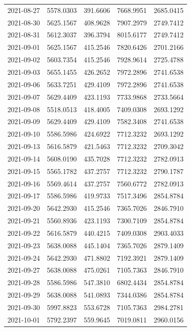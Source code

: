 \begin{footnotesize}
\begin{longtable}{lllll}
2021-08-27 & 5578.0303 & 391.6606 & 7668.9951 & 2685.0415 \\
2021-08-30 & 5625.1567 & 408.9628 & 7907.2979 & 2749.7412 \\
2021-08-31 & 5612.3037 & 396.3794 & 8015.6177 & 2749.7412 \\
2021-09-01 & 5625.1567 & 415.2546 & 7820.6426 & 2701.2166 \\
2021-09-02 & 5603.7354 & 415.2546 & 7928.9614 & 2725.4788 \\
2021-09-03 & 5655.1455 & 426.2652 & 7972.2896 & 2741.6538 \\
2021-09-06 & 5633.7251 & 429.4109 & 7972.2896 & 2741.6538 \\
2021-09-07 & 5629.4409 & 423.1193 & 7733.9868 & 2733.5664 \\
2021-09-08 & 5518.0513 & 418.4005 & 7409.0308 & 2693.1292 \\
2021-09-09 & 5629.4409 & 429.4109 & 7582.3408 & 2741.6538 \\
2021-09-10 & 5586.5986 & 424.6922 & 7712.3232 & 2693.1292 \\
2021-09-13 & 5616.5879 & 421.5463 & 7712.3232 & 2709.3042 \\
2021-09-14 & 5608.0190 & 435.7028 & 7712.3232 & 2782.0913 \\
2021-09-15 & 5565.1782 & 437.2757 & 7712.3232 & 2790.1787 \\
2021-09-16 & 5569.4614 & 437.2757 & 7560.6772 & 2782.0913 \\
2021-09-17 & 5586.5986 & 419.9733 & 7517.3496 & 2854.8784 \\
2021-09-20 & 5642.2930 & 415.2546 & 7365.7026 & 2846.7910 \\
2021-09-21 & 5560.8936 & 423.1193 & 7300.7109 & 2854.8784 \\
2021-09-22 & 5616.5879 & 440.4215 & 7409.0308 & 2903.4033 \\
2021-09-23 & 5638.0088 & 445.1404 & 7365.7026 & 2879.1409 \\
2021-09-24 & 5642.2930 & 471.8802 & 7192.3921 & 2879.1409 \\
2021-09-27 & 5638.0088 & 475.0261 & 7105.7363 & 2846.7910 \\
2021-09-28 & 5586.5986 & 547.3810 & 6802.4434 & 2854.8784 \\
2021-09-29 & 5638.0088 & 541.0893 & 7344.0386 & 2854.8784 \\
2021-09-30 & 5997.8823 & 553.6728 & 7105.7363 & 2984.2781 \\
2021-10-01 & 5792.2397 & 559.9645 & 7019.0811 & 2960.0156 \\

\end{longtable}
\end{footnotesize}
